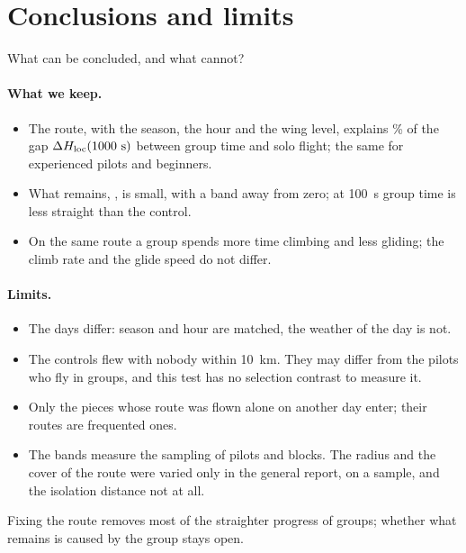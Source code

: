 \section{Conclusions and limits}\label{sec:conclusions}

What can be concluded, and what cannot?

\paragraph{What we keep.}
\begin{itemize}
  \item The route, with the season, the hour and the wing level, explains \IsoExplained\% of the gap
        $\Delta H_\mathrm{loc}(1000~\mathrm{s})$ between group time and solo flight; the same for experienced
        pilots and beginners.
  \item What remains, \IsoDHloc{} \IsoDHlocBand{}, is small, with a band away from zero; at 100~s group
        time is less straight than the control.
  \item On the same route a group spends more time climbing and less gliding; the climb rate and the
        glide speed do not differ.
\end{itemize}

\paragraph{Limits.}
\begin{itemize}
  \item The days differ: season and hour are matched, the weather of the day is not.
  \item The controls flew with nobody within 10~km. They may differ from the pilots who fly in
        groups, and this test has no selection contrast to measure it.
  \item Only the \IsoPieces{} pieces whose route was flown alone on another day enter; their routes
        are frequented ones.
  \item The bands measure the sampling of pilots and blocks. The radius and the cover of the route
        were varied only in the general report, on a sample, and the isolation distance not at all.
\end{itemize}
Fixing the route removes most of the straighter progress of groups; whether what remains is caused by
the group stays open.
